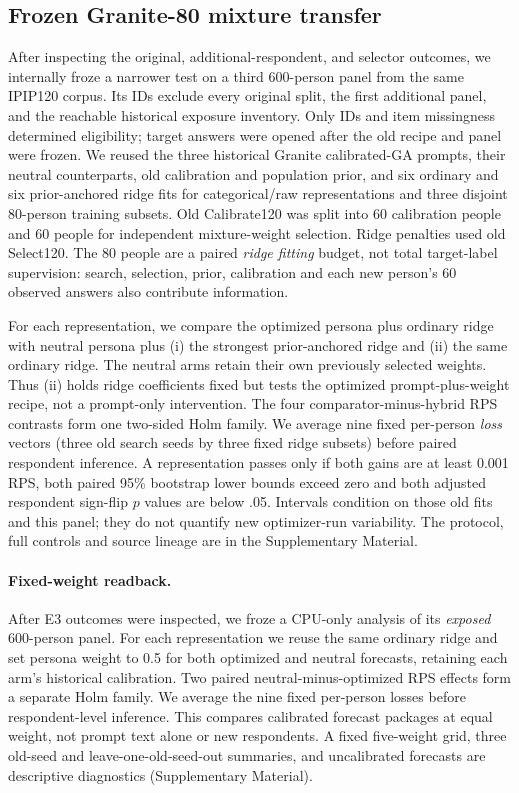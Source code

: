 \documentclass[sigconf,anonymous]{aamas}
\begin{document}
\subsection{Frozen Granite-80 mixture transfer}
After inspecting the original, additional-respondent, and selector outcomes,
we internally froze a narrower test on a third 600-person panel from the same
IPIP120 corpus. Its IDs exclude every original split, the first additional
panel, and the reachable historical exposure inventory. Only IDs and item
missingness determined eligibility; target answers were opened after the old
recipe and panel were frozen. We reused the three historical Granite
calibrated-GA prompts, their neutral counterparts, old calibration and
population prior, and six ordinary and six prior-anchored ridge fits for
categorical/raw representations and three disjoint 80-person training
subsets. Old Calibrate120 was split into 60 calibration people and 60 people
for independent mixture-weight selection. Ridge penalties used old Select120.
The 80 people are a paired \emph{ridge fitting} budget, not total target-label
supervision: search, selection, prior, calibration and each new person's 60
observed answers also contribute information.

For each representation, we compare the optimized persona plus ordinary ridge with neutral persona plus (i) the strongest prior-anchored ridge and
(ii) the same ordinary ridge. The neutral arms retain their own previously
selected weights. Thus (ii) holds ridge coefficients fixed but tests the
optimized prompt-plus-weight recipe, not a prompt-only intervention. The four
comparator-minus-hybrid RPS contrasts form one two-sided Holm family. We
average nine fixed per-person \emph{loss} vectors (three old search seeds by
three fixed ridge subsets) before paired respondent inference. A
representation passes only if both gains are at least 0.001 RPS, both paired
95\% bootstrap lower bounds exceed zero and both adjusted respondent
sign-flip $p$ values are below .05. Intervals condition on those old fits and
this panel; they do not quantify new optimizer-run variability. The protocol,
full controls and source lineage are in the Supplementary Material.

\paragraph{Fixed-weight readback.}
After E3 outcomes were inspected, we froze a CPU-only analysis of its
\emph{exposed} 600-person panel. For each representation we reuse the same
ordinary ridge and set persona weight to 0.5 for both optimized and neutral
forecasts, retaining each arm's historical calibration. Two paired
neutral-minus-optimized RPS effects form a separate Holm family. We average
the nine fixed per-person losses before respondent-level inference. This
compares calibrated forecast packages at equal weight, not prompt text alone
or new respondents. A fixed five-weight grid, three old-seed and
leave-one-old-seed-out summaries, and uncalibrated forecasts are descriptive
diagnostics (Supplementary Material).
\end{document}
